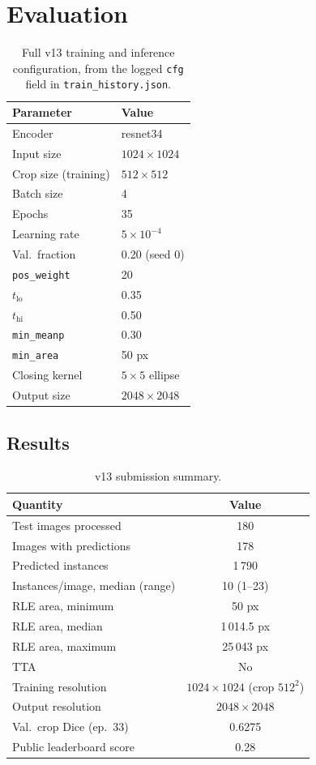 \documentclass[sigconf]{acmart}
\begin{document}
\section{Evaluation}

\begin{table}[h]
\caption{Full v13 training and inference configuration, from the logged
\texttt{cfg} field in \texttt{train\_history.json}.}
\label{tab:cfg}
\begin{tabular}{ll}
\toprule
Parameter & Value \\
\midrule
Encoder & resnet34 \\
Input size & $1024\times1024$ \\
Crop size (training) & $512\times512$ \\
Batch size & 4 \\
Epochs & 35 \\
Learning rate & $5\times10^{-4}$ \\
Val.\ fraction & 0.20 (seed 0) \\
\texttt{pos\_weight} & 20 \\
$t_{\mathrm{lo}}$ & 0.35 \\
$t_{\mathrm{hi}}$ & 0.50 \\
\texttt{min\_meanp} & 0.30 \\
\texttt{min\_area} & 50 px \\
Closing kernel & $5\times5$ ellipse \\
Output size & $2048\times2048$ \\
\bottomrule
\end{tabular}
\end{table}

\subsection{Results}

\begin{table}[h]
\caption{v13 submission summary.}
\label{tab:results}
\begin{tabular}{lc}
\toprule
Quantity & Value \\
\midrule
Test images processed    & 180 \\
Images with predictions  & 178 \\
Predicted instances      & 1\,790 \\
Instances/image, median (range) & 10 (1--23) \\
RLE area, minimum & 50 px \\
RLE area, median & 1\,014.5 px \\
RLE area, maximum & 25\,043 px \\
TTA                      & No \\
Training resolution      & $1024\times1024$ (crop $512^2$) \\
Output resolution        & $2048\times2048$ \\
Val.\ crop Dice (ep.\ 33) & 0.6275 \\
Public leaderboard score & 0.28 \\
\bottomrule
\end{tabular}
\end{table}
\end{document}
